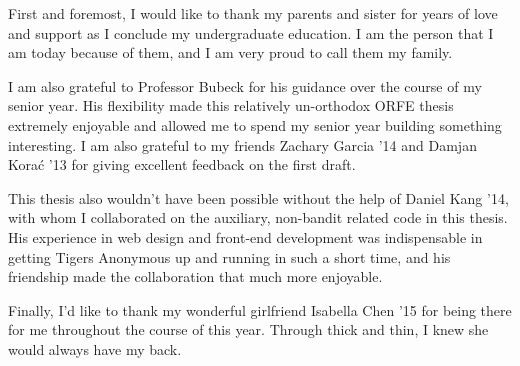 First and foremost, I would like to thank my parents and sister for years of love and support as I conclude my undergraduate education. I am the person that I am today because of them, and I am very proud to call them my family.

I am also grateful to Professor Bubeck for his guidance over the course of my senior year. His flexibility made this relatively un-orthodox ORFE thesis extremely enjoyable and allowed me to spend my senior year building something interesting. I am also grateful to my friends Zachary Garcia '14 and Damjan Kora\'{c} '13 for giving excellent feedback on the first draft.

This thesis also wouldn't have been possible without the help of Daniel Kang '14, with whom I collaborated on the auxiliary, non-bandit related code in this thesis. His experience in web design and front-end development was indispensable in getting Tigers Anonymous up and running in such a short time, and his friendship made the collaboration that much more enjoyable.

Finally, I'd like to thank my wonderful girlfriend Isabella Chen '15 for being there for me throughout the course of this year. Through thick and thin, I knew she would always have my back.
